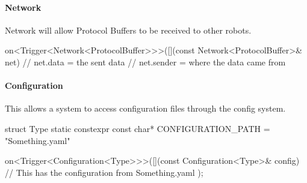 \documentclass[a4paper]{article}
\begin{document}
    \paragraph{Network} Network will allow Protocol Buffers to be received to other robots.\\
    \begin{cppcode}
        on<Trigger<Network<ProtocolBuffer>>>([](const Network<ProtocolBuffer>& net) {
            // net.data = the sent data
            // net.sender = where the data came from
        }
    \end{cppcode}

    \paragraph{Configuration} This allows a system to access configuration files through the config system.\\
    \begin{cppcode}
        struct Type {
            static constexpr const char* CONFIGURATION_PATH = "Something.yaml"
        }

        on<Trigger<Configuration<Type>>>([](const Configuration<Type>& config) {
            // This has the configuration from Something.yaml
        });
    \end{cppcode}
\end{document}
